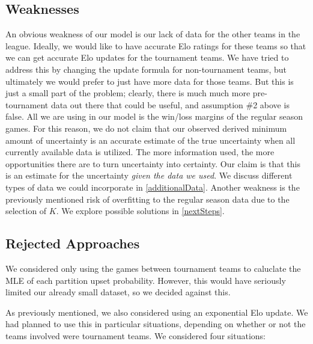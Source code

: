\documentclass{article}
\begin{document}
\subsection{Weaknesses}
An obvious weakness of our model is our lack of data for the other teams in the league. Ideally, we would like to have accurate Elo ratings for these teams so that we can get accurate Elo updates for the tournament teams. We have tried to address this by changing the update formula for non-tournament teams, but ultimately we would prefer to just have more data for those teams. But this is just a small part of the problem; clearly, there is much much more pre-tournament data out there that could be useful, and assumption \#2 above is false. All we are using in our model is the win/loss margins of the regular season games. For this reason, we do not claim that our observed derived minimum amount of uncertainty is an accurate estimate of the true uncertainty when all currently available data is utilized. The more information used, the more opportunities there are to turn uncertainty into certainty. Our claim is that this is an estimate for the uncertainty \textit{given the data we used}. We discuss different types of data we could incorporate in \autoref{additionalData}. Another weakness is the previously mentioned risk of overfitting to the regular season data due to the selection of $K$. We explore possible solutions in \autoref{nextSteps}.

\subsection{Rejected Approaches}
We considered only using the games between tournament teams to caluclate the MLE of each partition upset probability. However, this would have seriously limited our already small dataset, so we decided against this. 

As previously mentioned, we also considered using an exponential Elo update. We had planned to use this in particular situations, depending on whether or not the teams involved were tournament teams. We considered four situations:
\end{document}
